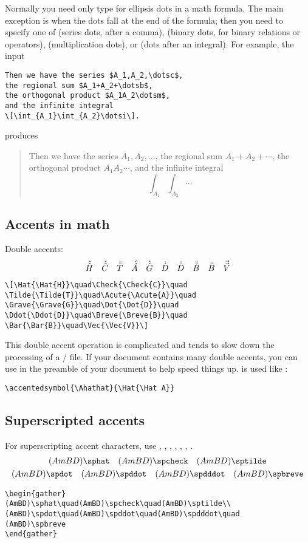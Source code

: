 Normally you need only type  for ellipsis dots in a
math formula.  The main exception is when the dots
fall at the end of the formula; then you need to
specify one of  (series dots, after a comma),
 (binary dots, for binary relations or operators),
 (multiplication dots), or  (dots after
an integral).  For example, the input
\begin{verbatim}
Then we have the series $A_1,A_2,\dotsc$,
the regional sum $A_1+A_2+\dotsb$,
the orthogonal product $A_1A_2\dotsm$,
and the infinite integral
\[\int_{A_1}\int_{A_2}\dotsi\].
\end{verbatim}
produces
\begin{quotation}
Then we have the series $A_1,A_2,\dotsc$,
the regional sum $A_1+A_2+\dotsb$,
the orthogonal product $A_1A_2\dotsm$,
and the infinite integral
\[\int_{A_1}\int_{A_2}\dotsi\]
\end{quotation}

\subsection{Accents in math}

Double accents:
\[\Hat{\Hat{H}}\quad\Check{\Check{C}}\quad
\Tilde{\Tilde{T}}\quad\Acute{\Acute{A}}\quad
\Grave{\Grave{G}}\quad\Dot{\Dot{D}}\quad
\Ddot{\Ddot{D}}\quad\Breve{\Breve{B}}\quad
\Bar{\Bar{B}}\quad\Vec{\Vec{V}}\]
\begin{verbatim}
\[\Hat{\Hat{H}}\quad\Check{\Check{C}}\quad
\Tilde{\Tilde{T}}\quad\Acute{\Acute{A}}\quad
\Grave{\Grave{G}}\quad\Dot{\Dot{D}}\quad
\Ddot{\Ddot{D}}\quad\Breve{\Breve{B}}\quad
\Bar{\Bar{B}}\quad\Vec{\Vec{V}}\]
\end{verbatim}
This double accent operation is complicated
and tends to slow down the processing of a \tex/ file.
If your document contains many double accents, you can
use  in the preamble of your document to
help speed things up.  
is used like :
\begin{verbatim}
\accentedsymbol{\Ahathat}{\Hat{\Hat A}}
\end{verbatim}

\subsection{Superscripted accents}
For superscripting accent characters, use ,
, , , , , 
.
\begin{gather}
(AmBD)\sphat\quad(AmBD)\spcheck\quad(AmBD)\sptilde\\
(AmBD)\spdot\quad(AmBD)\spddot\quad(AmBD)\spdddot\quad
(AmBD)\spbreve
\end{gather}
\begin{verbatim}
\begin{gather}
(AmBD)\sphat\quad(AmBD)\spcheck\quad(AmBD)\sptilde\\
(AmBD)\spdot\quad(AmBD)\spddot\quad(AmBD)\spdddot\quad
(AmBD)\spbreve
\end{gather}
\end{verbatim}


